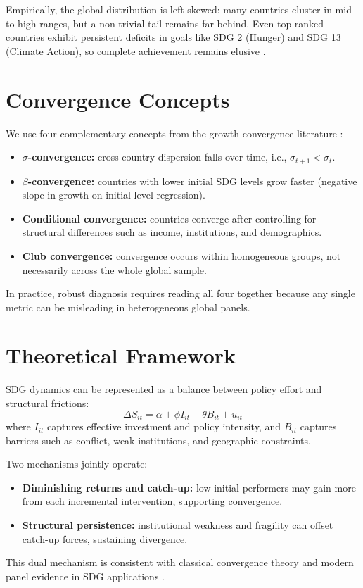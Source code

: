 Empirically, the global distribution is left-skewed: many countries cluster in mid-to-high ranges, but a non-trivial tail remains far behind. Even top-ranked countries exhibit persistent deficits in goals like SDG 2 (Hunger) and SDG 13 (Climate Action), so complete achievement remains elusive \citep{sachs2025}.

\chapter{Convergence Concepts}
We use four complementary concepts from the growth-convergence literature \citep{barro1992,salaimartin1996,phillips2007}:
\begin{itemize}
    \item \textbf{$\sigma$-convergence:} cross-country dispersion falls over time, i.e., $\sigma_{t+1} < \sigma_t$.
    \item \textbf{$\beta$-convergence:} countries with lower initial SDG levels grow faster (negative slope in growth-on-initial-level regression).
    \item \textbf{Conditional convergence:} countries converge after controlling for structural differences such as income, institutions, and demographics.
    \item \textbf{Club convergence:} convergence occurs within homogeneous groups, not necessarily across the whole global sample.
\end{itemize}
In practice, robust diagnosis requires reading all four together because any single metric can be misleading in heterogeneous global panels.

\chapter{Theoretical Framework}
SDG dynamics can be represented as a balance between policy effort and structural frictions:
\[
\Delta S_{it} = \alpha + \phi I_{it} - \theta B_{it} + u_{it}
\]
where $I_{it}$ captures effective investment and policy intensity, and $B_{it}$ captures barriers such as conflict, weak institutions, and geographic constraints.

Two mechanisms jointly operate:
\begin{itemize}
    \item \textbf{Diminishing returns and catch-up:} low-initial performers may gain more from each incremental intervention, supporting convergence.
    \item \textbf{Structural persistence:} institutional weakness and fragility can offset catch-up forces, sustaining divergence.
\end{itemize}
This dual mechanism is consistent with classical convergence theory and modern panel evidence in SDG applications \citep{barro1992,salaimartin1996,bigerna2025}.

